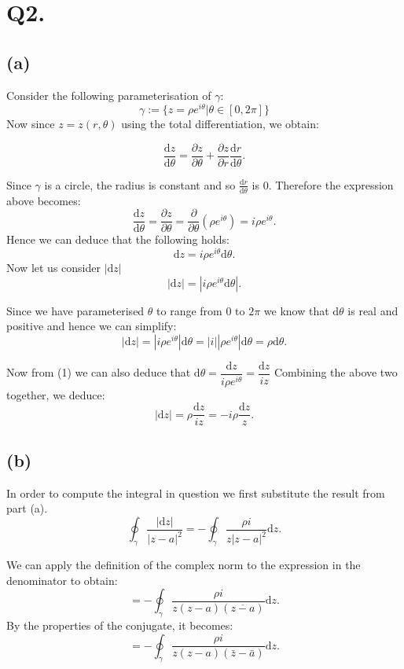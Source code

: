 \documentclass[12pt]{article}
\begin{document}
\section*{Q2.}
\subsection*{(a)}
Consider the following parameterisation of $\gamma$:
\[\gamma := \{ z=\rho e^{i\theta} | \theta \in [0, 2\pi] \}\]
Now since $ z = z(r, \theta) $ using the total differentiation, we obtain:

\[
	\frac{\text{d} z}{\text{d} \theta} = \frac{\partial z}{\partial \theta} + \frac{\partial z}{\partial r} \frac{\text{d} r}{\text{d} \theta}
.\]

Since $\gamma$ is a circle, the radius is constant and so $\frac{\text{d} r}{\text{d} \theta}$ is 0. 
Therefore the expression above becomes:
\[
	\frac{\text{d} z}{\text{d} \theta} = \frac{\partial z}{\partial \theta} 
	= \frac{\partial  }{\partial \theta} \left(\rho e^{i\theta}\right)
	= i\rho e^{i\theta}
.\]
Hence we can deduce that the following holds:
\begin{equation}
	\text{d}z = i\rho e^{i\theta} \text{d}\theta
.\end{equation}
Now let us consider $|\text{d}z|$ 
\[
	|\text{d}z| = |i\rho e^{i\theta} \text{d} \theta|
.\]

Since we have parameterised $\theta$ to range from $0 \text{ to } 2\pi$ we know that $\text{d} \theta$ is real and positive and hence we can simplify:
\[
|\text{d}z| = |i\rho e^{i\theta}|\text{d} \theta = |i| |\rho e^{i\theta}| \text{d}\theta = \rho \text{d}\theta
.\]

Now from (1) we can also deduce that $\text{d}\theta = \dfrac{\text{d}z}{i \rho e^{i\theta}} = \dfrac{\text{d}z}{iz}$
Combining the above two together, we deduce: 
\[
|\text{d}z| = \rho \frac{\text{d}z}{iz} =  - i\rho \frac{\text{d}z}{z}
.\]

\subsection*{(b)}
In order to compute the integral in question we first substitute the result from part (a).
\[
	\oint_\gamma \frac{|\text{d}z|}{|z - a|^2} = - \oint_\gamma \frac{\rho i}{z |z - a|^2} \text{d} z
.\]

We can apply the definition of the complex norm to the expression in the denominator to obtain:
\[
	= - \oint_\gamma \frac{\rho i}{z (z - a) (\overline{z - a})} \text{d} z
.\]
By the properties of the conjugate, it becomes:
\[
= - \oint_\gamma \frac{\rho i}{z (z - a) (\bar{z} - \bar{a})} \text{d} z
.\]
\end{document}
